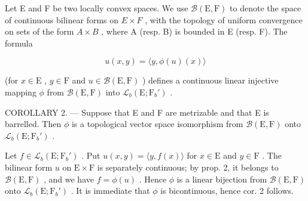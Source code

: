 Let E and F be two locally convex spaces. We use \(\mathcal{B}(\mathrm{E},\mathrm{F})\) to denote the space of continuous bilinear forms on \(E \times F\) , with the topology of uniform convergence on sets of the form \(A \times B\) , where A (resp. B) is bounded in E (resp. F). The formula

\[
u (x, y) = \langle y, \phi (u) (x) \rangle
\]

(for \(x \in \mathrm{E}\) , \(y \in \mathrm{F}\) and \(u \in \mathcal{B}(\mathrm{E}, \mathrm{F})\) ) defines a continuous linear injective mapping \(\phi\) from \(\mathcal{B}(\mathrm{E}, \mathrm{F})\) into \(\mathcal{L}_b(\mathrm{E}; \mathrm{F}_b')\) .

COROLLARY 2. --- Suppose that E and F are metrizable and that E is barrelled. Then \(\phi\) is a topological vector space isomorphism from \(\mathcal{B}(\mathrm{E},\mathrm{F})\) onto \(\mathcal{L}_b(\mathrm{E};\mathrm{F}_b')\) .

Let \(f \in \mathcal{L}_b(\mathrm{E}; \mathrm{F}_b')\) . Put \(u(x, y) = \langle y, f(x) \rangle\) for \(x \in \mathrm{E}\) and \(y \in \mathrm{F}\) . The bilinear form \(u\) on \(\mathrm{E} \times \mathrm{F}\) is separately continuous; by prop. 2, it belongs to \(\mathcal{B}(\mathrm{E}, \mathrm{F})\) , and we have \(f = \phi(u)\) . Hence \(\phi\) is a linear bijection from \(\mathcal{B}(\mathrm{E}, \mathrm{F})\) onto \(\mathcal{L}_b(\mathrm{E}; \mathrm{F}_b')\) . It is immediate that \(\phi\) is bicontinuous, hence cor. 2 follows.

